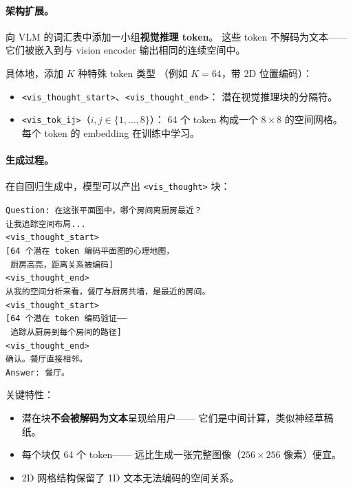 \documentclass[12pt,a4paper]{article}
\begin{document}
\paragraph{架构扩展。}
向 VLM 的词汇表中添加一小组\textbf{视觉推理 token}。
这些 token 不解码为文本——
它们被嵌入到与 vision encoder 输出相同的连续空间中。

具体地，添加 $K$ 种特殊 token 类型
（例如 $K = 64$，带 2D 位置编码）：
\begin{itemize}[leftmargin=2em]
  \item \texttt{<vis\_thought\_start>}、\texttt{<vis\_thought\_end>}：
    潜在视觉推理块的分隔符。
  \item \texttt{<vis\_tok\_ij>}（$i, j \in \{1, \ldots, 8\}$）：
    64 个 token 构成一个 $8 \times 8$ 的空间网格。
    每个 token 的 embedding 在训练中学习。
\end{itemize}

\paragraph{生成过程。}
在自回归生成中，模型可以产出 \texttt{<vis\_thought>} 块：

\begin{tcolorbox}[colback=gray!5,colframe=gray!50,boxrule=0.3pt,left=4pt,right=4pt]
\small
\texttt{Question: 在这张平面图中，哪个房间离厨房最近？}\\[3pt]
\texttt{让我追踪空间布局...}\\[2pt]
\texttt{<vis\_thought\_start>}\\
\texttt{[64 个潜在 token 编码平面图的心理地图，}\\
\texttt{ 厨房高亮，距离关系被编码]}\\
\texttt{<vis\_thought\_end>}\\[2pt]
\texttt{从我的空间分析来看，餐厅与厨房共墙，是最近的房间。}\\[2pt]
\texttt{<vis\_thought\_start>}\\
\texttt{[64 个潜在 token 编码验证——}\\
\texttt{ 追踪从厨房到每个房间的路径]}\\
\texttt{<vis\_thought\_end>}\\[2pt]
\texttt{确认。餐厅直接相邻。}\\
\texttt{Answer: 餐厅。}
\end{tcolorbox}

\noindent
关键特性：
\begin{itemize}[leftmargin=2em]
  \item 潜在块\textbf{不会被解码为文本}呈现给用户——
    它们是中间计算，类似神经草稿纸。
  \item 每个块仅 64 个 token——
    远比生成一张完整图像（$256 \times 256$ 像素）便宜。
  \item 2D 网格结构保留了 1D 文本无法编码的空间关系。
\end{itemize}
\end{document}
